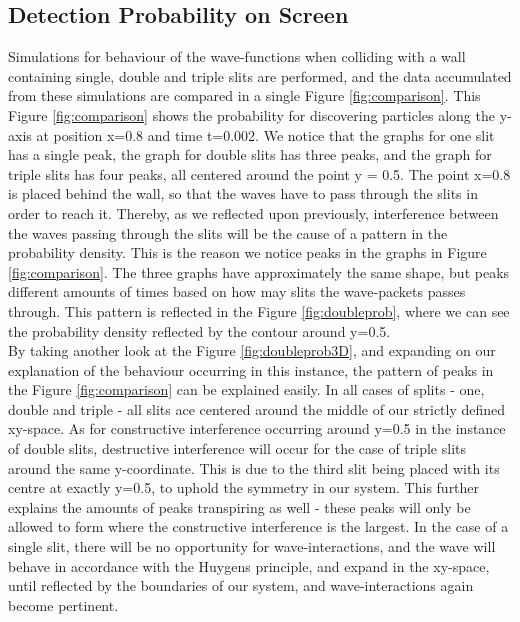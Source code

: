 \documentclass[10pt, nofootinbib, twocolumn]{revtex4-1}
\begin{document}
\subsection{Detection Probability on Screen}
Simulations for behaviour of the wave-functions when colliding with a wall containing single, double and triple slits are performed, and the data accumulated from these simulations are compared in a single Figure \ref{fig:comparison}. This Figure \ref{fig:comparison} shows the probability for discovering particles along the y-axis at position x=0.8 and time t=0.002. We notice that the graphs for one slit has a single peak, the graph for double slits has three peaks, and the graph for triple slits has four peaks, all centered around the point y = 0.5. The point x=0.8 is placed behind the wall, so that the waves have to pass through the slits in order to reach it. Thereby, as we reflected upon previously, interference between the waves passing through the slits will be the cause of a pattern in the probability density. This is the reason we notice peaks in the graphs in Figure \ref{fig:comparison}. The three graphs have approximately the same shape, but peaks different amounts of times based on how may slits the wave-packets passes through. This pattern is reflected in the Figure \ref{fig:doubleprob}, where we can see the probability density reflected by the contour around y=0.5. \\

By taking another look at the Figure \ref{fig:doubleprob3D}, and expanding on our explanation of the behaviour occurring in this instance, the pattern of peaks in the Figure \ref{fig:comparison} can be explained easily. In all cases of splits - one, double and triple - all slits ace centered around the middle of our strictly defined xy-space. As for constructive interference occurring around y=0.5 in the instance of double slits, destructive interference will occur for the case of triple slits around the same y-coordinate. This is due to the third slit being placed with its centre at exactly y=0.5, to uphold the symmetry in our system. This further explains the amounts of peaks transpiring as well - these peaks will only be allowed to form where the constructive interference is the largest. In the case of a single slit, there will be no opportunity for wave-interactions, and the wave will behave in accordance with the Huygens principle, and expand in the xy-space, until reflected by the boundaries of our system, and wave-interactions again become pertinent.
\end{document}

